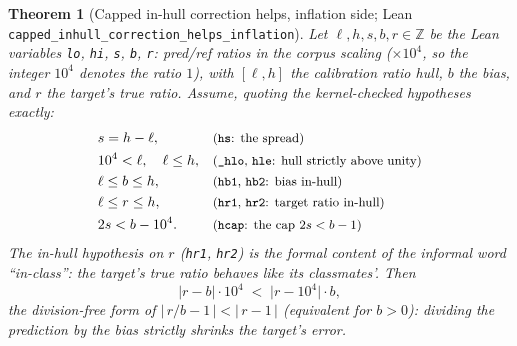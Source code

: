 \documentclass[11pt]{article}
\newtheorem{theorem}{Theorem}
\theoremstyle{definition}
\theoremstyle{remark}
\newcommand{\code}[1]{\texttt{#1}}
\begin{document}
\begin{theorem}[Capped in-hull correction helps, inflation side; Lean \code{capped\_inhull\_\allowbreak correction\_\allowbreak helps\_inflation}]\label{thm:capinf}
Let $\ell, h, s, b, r \in \mathbb{Z}$ be the Lean variables \code{lo}, \code{hi}, \code{s}, \code{b}, \code{r}: pred/ref ratios in the corpus scaling ($\times 10^4$, so the integer $10^4$ denotes the ratio $1$), with $[\ell, h]$ the calibration ratio hull, $b$ the bias, and $r$ the target's true ratio. Assume, quoting the kernel-checked hypotheses exactly:
\begin{align}
& s = h - \ell, && \text{\small\textup{(\code{hs}: the spread)}} \label{eq:capinf-hyp}\\
& 10^4 < \ell, \quad \ell \le h, && \text{\small\textup{(\code{\_hlo}, \code{hle}: hull strictly above unity)}} \nonumber\\
& \ell \le b \le h, && \text{\small\textup{(\code{hb1}, \code{hb2}: bias in-hull)}} \nonumber\\
& \ell \le r \le h, && \text{\small\textup{(\code{hr1}, \code{hr2}: target ratio in-hull)}} \nonumber\\
& 2s < b - 10^4 . && \text{\small\textup{(\code{hcap}: the cap $2s < b - 1$)}} \nonumber
\end{align}
The in-hull hypothesis on $r$ (\code{hr1}, \code{hr2}) is the formal content of the informal word ``in-class'': the target's true ratio behaves like its classmates'. Then
\begin{equation}\label{eq:capinf-concl}
\bigl|r - b\bigr| \cdot 10^4 \;<\; \bigl|r - 10^4\bigr| \cdot b ,
\end{equation}
the division-free form of $\bigl|\,r/b - 1\,\bigr| < \bigl|\,r - 1\,\bigr|$ (equivalent for $b > 0$): dividing the prediction by the bias strictly shrinks the target's error.
\end{theorem}
\end{document}

